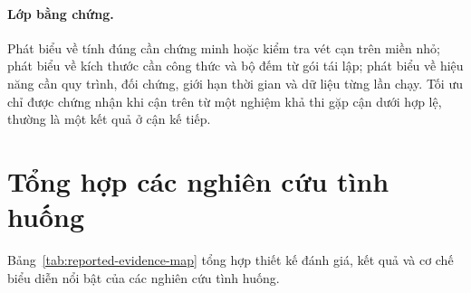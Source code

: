 \paragraph{Lớp bằng chứng.}
Phát biểu về tính đúng cần chứng minh hoặc kiểm tra vét cạn trên miền nhỏ; phát
biểu về kích thước cần công thức và bộ đếm từ gói tái lập; phát biểu về hiệu
năng cần quy trình, đối chứng, giới hạn thời gian và dữ liệu từng lần chạy.
Tối ưu chỉ được chứng nhận khi cận trên từ một nghiệm khả thi gặp cận dưới hợp
lệ, thường là một kết quả
\UNSAT ở cận kế tiếp.

\section{Tổng hợp các nghiên cứu tình huống}

Bảng~\ref{tab:reported-evidence-map} tổng hợp thiết kế đánh giá, kết quả và cơ
chế biểu diễn nổi bật của các nghiên cứu tình huống.

